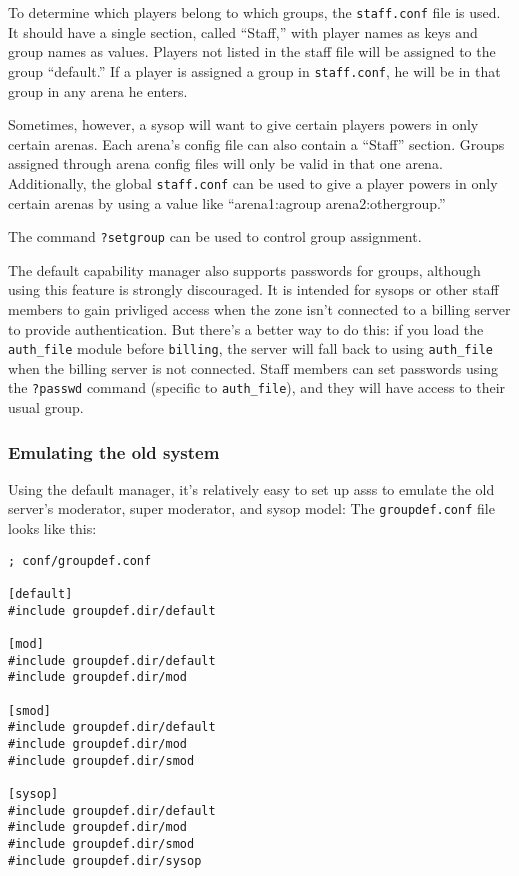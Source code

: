 \documentclass{article}
\newcommand{\asss}{asss}
\begin{document}
To determine which players belong to which groups, the \verb/staff.conf/
file is used. It should have a single section, called ``Staff,'' with
player names as keys and group names as values. Players not listed in
the staff file will be assigned to the group ``default.'' If a player is
assigned a group in \verb/staff.conf/, he will be in that group in any
arena he enters.

Sometimes, however, a sysop will want to give certain players powers in
only certain arenas. Each arena's config file can also contain a
``Staff'' section. Groups assigned through arena config files will only
be valid in that one arena. Additionally, the global \verb/staff.conf/
can be used to give a player powers in only certain arenas by using a
value like ``arena1:agroup arena2:othergroup.''

The command \verb/?setgroup/ can be used to control group assignment.

The default capability manager also supports passwords for groups,
although using this feature is strongly discouraged. It is intended for
sysops or other staff members to gain privliged access when the zone
isn't connected to a billing server to provide authentication. But
there's a better way to do this: if you load the \verb/auth_file/ module
before \verb/billing/, the server will fall back to using
\verb/auth_file/ when the billing server is not connected. Staff members
can set passwords using the \verb/?passwd/ command (specific to
\verb/auth_file/), and they will have access to their usual group.


\subsubsection{Emulating the old system}
Using the default manager, it's relatively easy to set up \asss{} to
emulate the old server's moderator, super moderator, and sysop model:
The \verb/groupdef.conf/ file looks like this:

\begin{verbatim}
; conf/groupdef.conf

[default]
#include groupdef.dir/default

[mod]
#include groupdef.dir/default
#include groupdef.dir/mod

[smod]
#include groupdef.dir/default
#include groupdef.dir/mod
#include groupdef.dir/smod

[sysop]
#include groupdef.dir/default
#include groupdef.dir/mod
#include groupdef.dir/smod
#include groupdef.dir/sysop
\end{verbatim}
\end{document}
